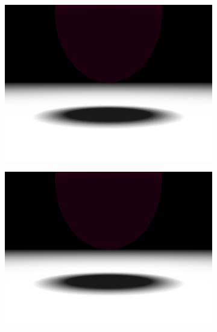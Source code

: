 \documentclass{article}
\begin{document}
\begin{figure}[hb]
  \begin{subfigure}{0.45\textwidth}
    \includegraphics[width=1\textwidth]{images/samples50.png}
  \end{subfigure}
  \begin{subfigure}{0.45\textwidth}
    \includegraphics[width=1\textwidth]{images/samples100.png}
  \end{subfigure}


\end{figure}
\end{document}
